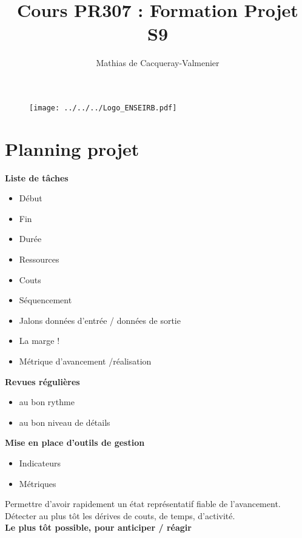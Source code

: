\documentclass[10pt,a4paper]{article}
\title{Cours PR307 : Formation Projet S9}
\author{Mathias de Cacqueray-Valmenier }
\begin{document}
\maketitle

\begin{figure}[ht]
\begin{center}
\noindent \texttt{[image: ../../../Logo\_ENSEIRB.pdf]}
\end{center}
\end{figure}


\newpage

\tableofcontents

\newpage

\section{Planning projet}
\textbf{Liste de tâches}
\begin{itemize}
\item Début
\item Fin
\item Durée
\item Ressources
\item Couts
\item Séquencement
\item Jalons données d'entrée / données de sortie
\item La marge !
\item Métrique d'avancement /réalisation
\end{itemize}
\textbf{Revues régulières}
\begin{itemize}
\item au bon rythme
\item au bon niveau de détails
\end{itemize}
\textbf{Mise en place d'outils de gestion}
\begin{itemize}
\item Indicateurs
\item Métriques
\end{itemize}
Permettre d'avoir rapidement un état représentatif fiable de l'avancement.\\
Détecter au plus tôt les dérives de couts, de temps, d'activité.\\
\textbf{Le plus tôt possible, pour anticiper / réagir}
\end{document}
